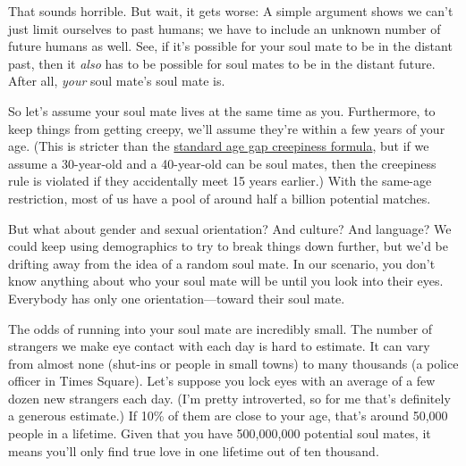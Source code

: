 {That sounds horrible. But wait, it gets worse: A simple argument shows we can’t just limit ourselves to past humans; we have to include an unknown number of future humans as well. See, if it’s possible for your soul mate to be in the distant past, then it \emph{also} has to be possible for soul mates to be in the distant future. After all, \emph{your} soul mate’s soul mate is.}

{So let’s assume your soul mate lives at the same time as you. Furthermore, to keep things from getting creepy, we’ll assume they’re within a few years of your age. (This is stricter than the \href{http://xkcd.com/314/}{standard age gap creepiness formula}, but if we assume a 30-year-old and a 40-year-old can be soul mates, then the creepiness rule is violated if they accidentally meet 15 years earlier.) With the same-age restriction, most of us have a pool of around half a billion potential matches.}

{But what about gender and sexual orientation? And culture? And language? We could keep using demographics to try to break things down further, but we’d be drifting away from the idea of a random soul mate. In our scenario, you don’t know anything about who your soul mate will be until you look into their eyes. Everybody has only one orientation—toward their soul mate.}

{The odds of running into your soul mate are incredibly small. The number of strangers we make eye contact with each day is hard to estimate. It can vary from almost none (shut-ins or people in small towns) to many thousands (a police officer in Times Square). Let’s suppose you lock eyes with an average of a few dozen new strangers each day. (I’m pretty introverted, so for me that’s definitely a generous estimate.) If 10\% of them are close to your age, that’s around 50,000 people in a lifetime. Given that you have 500,000,000 potential soul mates, it means you’ll only find true love in one lifetime out of ten thousand.}

